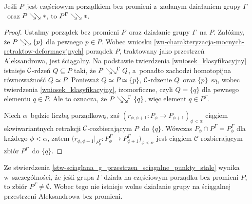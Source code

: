\begin{stw}\label{stw-sciaglana_g_przestrzen_sciagalne_punkty_stale}
Jeśli $P$~jest częściowym porządkiem bez promieni z~zadanym działaniem grupy $\Gamma$~oraz $P\searrow\!\!\searrow *$, to $P^\Gamma\searrow\!\!\searrow *$.  
\end{stw}
\begin{proof}
Ustalmy porządek bez promieni $P$~oraz działanie grupy $\Gamma$~na $P$. Załóżmy, że $P\searrow\!\!\searrow \{p\}$ dla pewnego $p\in P$. Wobec wniosku \ref{wn-charakteryzacja-mocnych-retraktow-deformacyjnych} porządek $P$, traktowany jako przestrzeń Aleksandrowa, jest ściągalny. Na podstawie twierdzenia \ref{wniosek_klasyfikacyjny} istnieje \mbox{$\mathcal{C}$-rdzeń} $Q\subseteq P$ taki, że $P\searrow\!\!\searrow^{\Gamma} Q$, a~ponadto zachodzi homotopijna równoważność $Q\simeq P$. Ponieważ $Q\simeq P\simeq \{p\}$, $\mathcal{C}$-rdzenie $Q$~oraz $\{p\}$~są, wobec twierdzenia \ref{wniosek_klasyfikacyjny}, izomorficzne, czyli $Q=\{q\}$ dla pewnego elementu $q\in P$. Ale to oznacza, że $P\searrow\!\!\searrow^\Gamma \{q\}$, więc element $q\in P^\Gamma$.

Niech $\alpha$~będzie liczbą porządkową, zaś $\left(r_{\phi,\phi+1}\colon P_{\phi}\to P_{\phi+1}\right)_{\phi<\alpha}$ ciągiem ekwiwariantnych retrakcji \mbox{$\mathcal{C}$-rozbierającym} $P$~do $\{q\}$. Wówczas $P_{\phi}\cap P^\Gamma=P_\phi^\Gamma$ dla każdego $\phi<\alpha$, zatem $\bigl(r_{\phi,\phi+1}\big|_{P_{\phi}^\Gamma}\colon P_{\phi}^\Gamma\to P_{\phi+1}^\Gamma\bigr)_{\phi<\alpha}$ jest ciągiem $\mathcal{C}$-rozbierającym zbiór $P^\Gamma$~do $\{q\}$.
\end{proof}

Ze stwierdzenia \ref{stw-sciaglana_g_przestrzen_sciagalne_punkty_stale} wynika w~szczególności, że jeśli grupa $\Gamma$~działa na częściowym porządku bez promieni $P$, to zbiór $P^\Gamma\not=\emptyset$. Wobec tego nie istnieje wolne działanie grupy na ściągalnej przestrzeni Aleksandrowa bez promieni.

